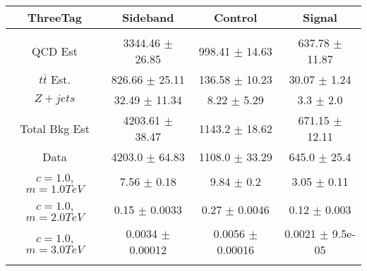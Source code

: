 \begin{footnotesize} 
\begin{tabular}{c|c|c|c} 
ThreeTag & Sideband & Control & Signal \\ 
\hline\hline 
& & & \\ 
QCD Est & 3344.46 $\pm$ 26.85 & 998.41 $\pm$ 14.63 & 637.78 $\pm$ 11.87\\ 
$t\bar{t}$ Est.  & 826.66 $\pm$ 25.11 & 136.58 $\pm$ 10.23 & 30.07 $\pm$ 1.24\\ 
$Z+jets$ & 32.49 $\pm$ 11.34 & 8.22 $\pm$ 5.29 & 3.3 $\pm$ 2.0\\ 
Total Bkg Est & 4203.61 $\pm$ 38.47 & 1143.2 $\pm$ 18.62 & 671.15 $\pm$ 12.11\\ 
Data & 4203.0 $\pm$ 64.83 & 1108.0 $\pm$ 33.29 & 645.0 $\pm$ 25.4\\ 
$c=1.0$,$m=1.0TeV$ & 7.56 $\pm$ 0.18 & 9.84 $\pm$ 0.2 & 3.05 $\pm$ 0.11\\ 
$c=1.0$,$m=2.0TeV$ & 0.15 $\pm$ 0.0033 & 0.27 $\pm$ 0.0046 & 0.12 $\pm$ 0.003\\ 
$c=1.0$,$m=3.0TeV$ & 0.0034 $\pm$ 0.00012 & 0.0056 $\pm$ 0.00016 & 0.0021 $\pm$ 9.5e-05\\ 
& & & \\ 
\hline\hline 
\end{tabular} 
\end{footnotesize} 
\newline 
